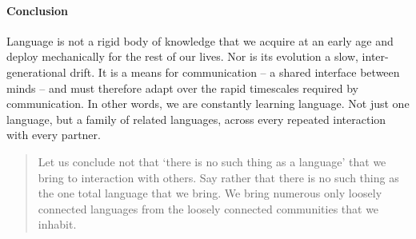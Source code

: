 

\paragraph{Conclusion}

Language is not a rigid body of knowledge that we acquire at an early age and deploy mechanically for the rest of our lives. 
Nor is its evolution a slow, inter-generational drift. 
It is a means for communication -- a shared interface between minds -- and must therefore adapt over the rapid timescales required by communication. 
In other words, we are constantly learning language. 
Not just one language, but a family of related languages, across every repeated interaction with every partner. 

\begin{quote}
Let us conclude not that ‘there is no such thing as a language’ that we bring to interaction with others. Say rather that there is no such thing as the one total language that we bring. We bring numerous only loosely connected languages from the loosely connected communities that we inhabit. 
\end{quote}
